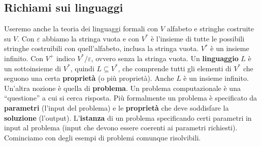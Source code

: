 \subsection{Richiami sui linguaggi}
Useremo anche la teoria dei linguaggi formali con $V$ alfabeto e stringhe
costruite su $V$. Con $\varepsilon$ abbiamo la stringa vuota e con $V^*$ è
l'insieme di tutte le possibili stringhe costruibili con quell'alfabeto, inclusa
la stringa vuota. $V^*$ è un insieme infinito. Con $V^+$ indico
$V^*/\varepsilon$, ovvero senza la stringa vuota. Un \textbf{linguaggio} $L$ è
un sottoinsieme di $V^*$, quindi $L\subseteq V^*$, che comprende tutti gli
elementi di $V^*$ che seguono una certa \textbf{proprietà} (o più
proprietà). Anche $L$ è un insieme infinito.\\
Un'altra nozione è quella di \textbf{problema}. Un problema computazionale è una
``questione'' a cui si cerca risposta. Più formalmente un problema è specificato
da \textbf{parametri} (l'input del problema) e le \textbf{proprietà} che deve
soddisfare la \textbf{soluzione} (l'output). L'\textbf{istanza} di un problema
specificando certi parametri in input al problema (input che devono essere
coerenti ai parametri richiesti).\\
Cominciamo con degli esempi di problemi comunque risolvibili.
